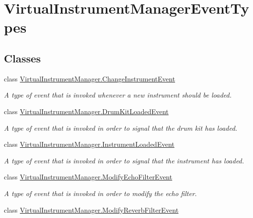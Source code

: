 \hypertarget{group___virtual_instrument_manager_event_types}{}\section{Virtual\+Instrument\+Manager\+Event\+Types}
\label{group___virtual_instrument_manager_event_types}
\subsection*{Classes}
\begin{DoxyCompactItemize}
\item 
class \hyperlink{class_virtual_instrument_manager_1_1_change_instrument_event}{Virtual\+Instrument\+Manager.\+Change\+Instrument\+Event}
\begin{DoxyCompactList}\small\item\em A type of event that is invoked whenever a new instrument should be loaded. \end{DoxyCompactList}\item 
class \hyperlink{class_virtual_instrument_manager_1_1_drum_kit_loaded_event}{Virtual\+Instrument\+Manager.\+Drum\+Kit\+Loaded\+Event}
\begin{DoxyCompactList}\small\item\em A type of event that is invoked in order to signal that the drum kit has loaded. \end{DoxyCompactList}\item 
class \hyperlink{class_virtual_instrument_manager_1_1_instrument_loaded_event}{Virtual\+Instrument\+Manager.\+Instrument\+Loaded\+Event}
\begin{DoxyCompactList}\small\item\em A type of event that is invoked in order to signal that the instrument has loaded. \end{DoxyCompactList}\item 
class \hyperlink{class_virtual_instrument_manager_1_1_modify_echo_filter_event}{Virtual\+Instrument\+Manager.\+Modify\+Echo\+Filter\+Event}
\begin{DoxyCompactList}\small\item\em A type of event that is invoked in order to modify the echo filter. \end{DoxyCompactList}\item 
class \hyperlink{class_virtual_instrument_manager_1_1_modify_reverb_filter_event}{Virtual\+Instrument\+Manager.\+Modify\+Reverb\+Filter\+Event}

\end{DoxyCompactItemize}
